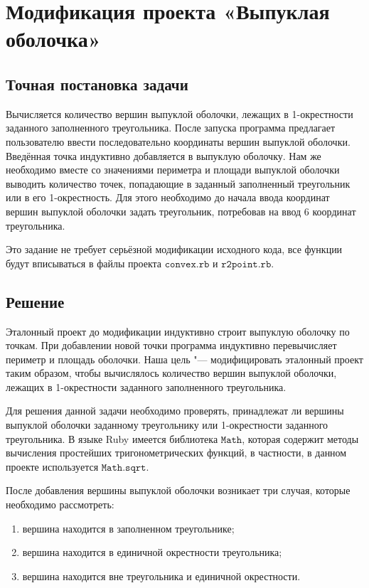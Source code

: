 \section{Модификация проекта «Выпуклая оболочка»}
\subsection*{Точная постановка задачи}
Вычисляется количество вершин выпуклой оболочки, лежащих в 1-окрестности заданного заполненного треугольника.
После запуска программа предлагает пользователю ввести последовательно координаты вершин выпуклой оболочки. Введённая точка индуктивно добавляется в
выпуклую оболочку. Нам же необходимо вместе со значениями периметра и площади
выпуклой оболочки выводить количество точек, попадающие в заданный заполненный треугольник или в его 1-окрестность. Для этого необходимо до начала ввода координат вершин выпуклой оболочки задать треугольник, потребовав на ввод 6 координат треугольника. 

  Это задание не требует серьёзной модификации исходного кода, все функции
будут вписываться в файлы проекта $\texttt{convex.rb}$ и $\texttt{r2point.rb}$.

\subsection*{Решение}
Эталонный проект до модификации индуктивно строит выпуклую оболочку по
точкам. При добавлении новой точки программа индуктивно перевычисляет периметр и
площадь оболочки. Наша цель "--- модифицировать эталонный проект таким 
образом, чтобы вычислялось количество вершин выпуклой оболочки, лежащих в 1-окрестности заданного заполненного треугольника.

  Для решения данной задачи необходимо проверять, принадлежат ли вершины выпуклой оболочки
заданному треугольнику или 1-окрестности заданного треугольника. В языке Ruby имеется библиотека $\texttt{Math}$, которая содержит
методы вычисления простейших тригонометрических функций, в частности, в данном проекте используется $\texttt{Math.sqrt}$.

  После добавления вершины выпуклой оболочки возникает три случая, которые необходимо рассмотреть: 
\begin{enumerate}
\item вершина находится в заполненном треугольнике;
\item вершина находится в единичной окрестности треугольника;
\item вершина находится вне треугольника и единичной окрестности.
\end{enumerate}
